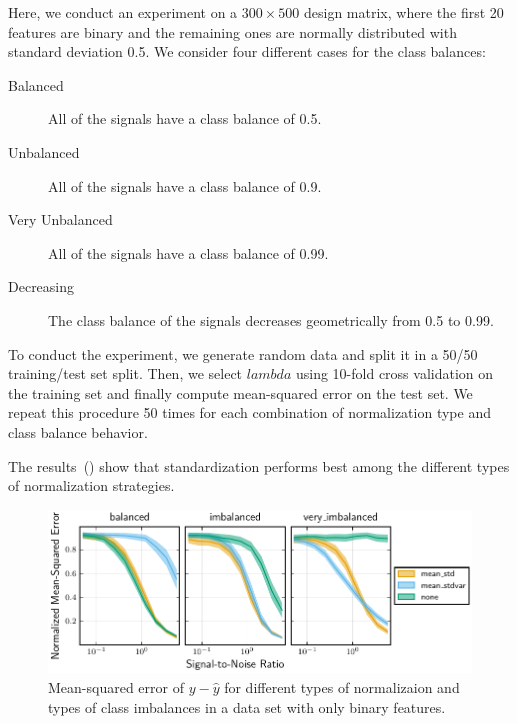 Here, we conduct an experiment on a \(300 \times 500\) design matrix, where the first 20 features are binary and the remaining ones are normally distributed with standard deviation 0.5. We consider four different cases for the class balances:
\begin{description}
  \item[Balanced] All of the signals have a class balance of 0.5.
  \item[Unbalanced] All of the signals have a class balance of 0.9.
  \item[Very Unbalanced] All of the signals have a class balance of 0.99.
  \item[Decreasing] The class balance of the signals decreases geometrically from 0.5 to 0.99.
\end{description}

To conduct the experiment, we generate random data and split it in a 50/50 training/test set split. Then, we select \(lambda\) using 10-fold cross validation on the training set and finally compute mean-squared error on the test set. We repeat this procedure 50 times for each combination of normalization type and class balance behavior.

The results~() show that standardization performs best among the different types of normalization strategies.

\begin{figure}[htpb]
  \centering
  \includegraphics[]{plots/binary_data_sim.pdf}
  \caption{%
    Mean-squared error of \(y - \hat y\) for different types of normalizaion and types of class imbalances in a data set with only binary features.
  }
  \label{fig:binary-sim}
\end{figure}


